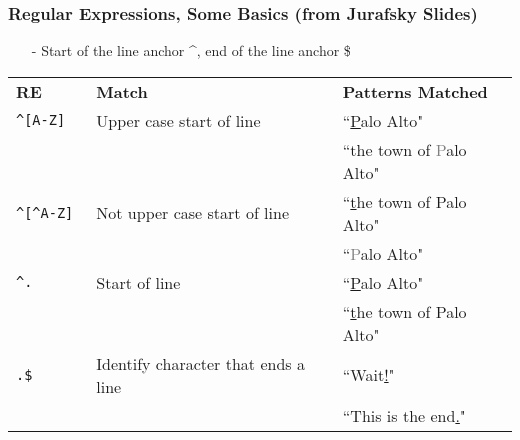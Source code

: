  \begin{frame}[fragile]
\frametitle{Regular Expressions, Some Basics (from Jurafsky Slides) } 

\begin{itemize}
\item[-] Start of the line anchor \alert{\^{}}, end of the line anchor \alert{\$}
\end{itemize}


\begin{center}
\begin{tabular}{lll}
\textbf{RE} & \textbf{Match} & \textbf{Patterns Matched}\\
{\tt \alert{\^{}}[A-Z] } & Upper case start of line & ``\underline{P}alo Alto" \\
                            &                                                        & ``the town of \textcolor{gray}{P}alo Alto" \\
{\tt \alert{\^{}}[\^{}A-Z] } & Not upper case start of line &      ``\underline{t}he town of Palo Alto" \\
                            &                                                        & ``\textcolor{gray}{P}alo Alto" \\
{\tt \alert{\^{}}.} & Start of line  & ``\underline{P}alo Alto" \\
                            &                                                        & ``\underline{t}he town of Palo Alto" \\
{\tt .\alert{\$} }      & Identify character that ends a line &    ``Wait\alert{\underline{!}}" \\
                              &                                                & ``This is the end\alert{\underline{.}}" \\

 \end{tabular}
 \end{center}                   


\end{frame}

